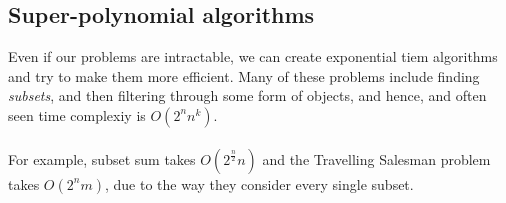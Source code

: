 \documentclass[journal, letterpaper]{IEEEtran}
\begin{document}
  \subsection{Super-polynomial algorithms}
  Even if our problems are intractable, we can create exponential tiem algorithms and try to make them more efficient.
  Many of these problems include finding \emph{subsets}, and then filtering through some form of objects, and hence,
  and often seen time complexiy is $O(2^n n^k)$.\\ \\  For example, subset sum takes $O(2^{\frac{n}{2}}n)$ and the 
  Travelling Salesman problem takes $O(2^nm)$, due to the way they consider every single subset.

  
\end{document}
